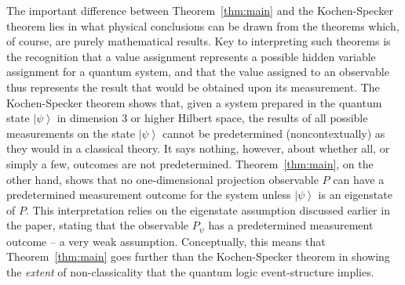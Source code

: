 \documentclass[%
 superscriptaddress,
 preprint,
 showpacs,
 showkeys,
 nofootinbib,
  amsmath,amssymb,
  aps,
  longbibliography,
  floatfix,
 ]{revtex4-1}
\theoremstyle{definition}
\newcommand{\bra}[1]{\left< #1 \right|}
\newcommand{\ket}[1]{\left| #1 \right>}
\begin{document}
The important difference between Theorem~\ref{thm:main} and the Kochen-Specker theorem lies in what physical conclusions can be drawn from the theorems which, of course, are purely mathematical results.
Key to interpreting such theorems is the recognition that a value assignment represents a possible hidden variable assignment for a quantum system, and that the value assigned to an observable thus represents the result that would be obtained upon its measurement.
The Kochen-Specker theorem shows that, given a system prepared in the quantum state $\ket{\psi}$ in dimension 3 or higher Hilbert space, the results of all possible measurements on the state $\ket{\psi}$ cannot be predetermined (noncontextually) as they would in a classical theory.
It says nothing, however, about whether all, or simply a few, outcomes are not predetermined.
{\color{blue}
Theorem~\ref{thm:main}, on the other hand, shows that {\color{blue} no} {\color{blue}one-dimensional projection observable $P$}
can have a predetermined measurement outcome for the system unless %
$\ket{\psi}$ is an eigenstate of $P$.
}
This interpretation relies on the eigenstate assumption discussed earlier in the paper, stating that the observable $P_\psi$ has a predetermined measurement outcome -- a very weak assumption.
Conceptually, this means that Theorem~\ref{thm:main} goes further than the Kochen-Specker theorem in showing the \emph{extent} of non-classicality that the quantum logic event-structure implies.
\end{document}

